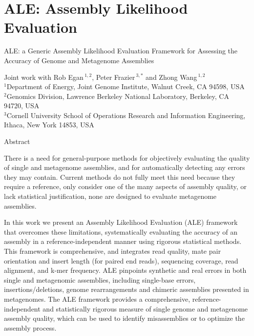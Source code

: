 \documentclass[phd,tocprelim]{cornell}
\begin{document}
\part{ALE: Assembly Likelihood Evaluation} %
\label{prt:ALE: Assembly Likelihood Evaluation}
\singlespacing

\noindent
\large
ALE: a Generic Assembly Likelihood Evaluation Framework for Assessing the Accuracy of Genome and Metagenome Assemblies

\noindent
\normalsize
Joint work with Rob Egan\,$^{1,2}$, Peter Frazier\,$^{3,*}$ and Zhong Wang\,$^{1,2}$ \\
\scriptsize
$^{1}$Department of Energy, Joint Genome Institute, Walnut Creek, CA 94598, USA\\
$^{2}$Genomics Division, Lawrence Berkeley National Laboratory, Berkeley, CA 94720, USA\\
$^{3}$Cornell University School of Operations Research and Information Engineering, Ithaca, New York 14853, USA
\normalsize

\normalspacing

\begin{center}
   Abstract 
\end{center}

There is a need for general-purpose methods for objectively evaluating the quality of single and metagenome assemblies, and for automatically detecting any errors they may contain.  Current methods do not fully meet this need because they require a reference, only consider one of the many aspects of assembly quality, or lack statistical justification, none are designed to evaluate metagenome assemblies.

In this work we present an Assembly Likelihood Evaluation (ALE) framework that overcomes these limitations, systematically evaluating the accuracy of an assembly in a reference-independent manner using rigorous statistical methods.  This framework is comprehensive, and integrates read quality, mate pair orientation and insert length (for paired end reads), sequencing coverage, read alignment, and k-mer frequency. ALE pinpoints synthetic and real errors in both single and metagenomic assemblies, including single-base errors, insertions/deletions, genome rearrangements and chimeric assemblies presented in metagenomes.  The ALE framework provides a comprehensive, reference-independent and statistically rigorous measure of single genome and metagenome assembly quality, which can be used to identify misassemblies or to optimize the assembly process.
\end{document}

